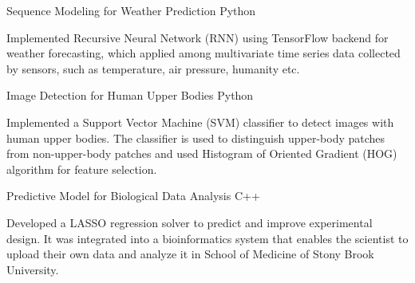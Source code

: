 \begin{cventries}

\projentry
{Sequence Modeling for Weather Prediction} %
{Python} %
{ %
\begin{cvitems}
\item{Implemented Recursive Neural Network ({RNN}) using TensorFlow backend for weather forecasting, which applied among multivariate time series data collected by sensors, such as temperature, air pressure, humanity etc.}
\end{cvitems}
}


\projentry
{Image Detection for Human Upper Bodies} %
{Python} %
{
\begin{cvitems}
\item{Implemented a Support Vector Machine ({SVM}) classifier to detect images with human upper bodies. The classifier is used to distinguish upper-body patches from non-upper-body patches and used Histogram of Oriented Gradient (HOG) algorithm for feature selection.}
\end{cvitems}
}




\projentry
{Predictive Model for Biological Data Analysis} %
{C++} %
{ %
\begin{cvitems}
\item{Developed a LASSO regression solver to predict and improve experimental design. It was integrated into a bioinformatics system that enables the scientist to upload their own data and analyze it in School of Medicine of Stony Brook University.}
\end{cvitems}
}



\end{cventries}
